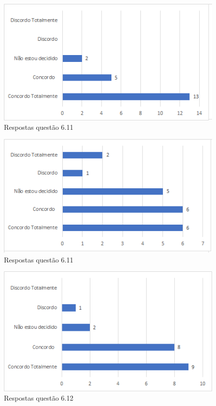 \begin{figure}[!t]
\centering
\includegraphics[scale=0.7]{figuras das questoes/6.10.png}
\caption{Respostas questão 6.11}
\end{figure}

\begin{figure}[!t]
\centering
\includegraphics[scale=0.7]{figuras das questoes/6.11.png}
\caption{Respostas questão 6.11}
\end{figure}

\begin{figure}[!t]
\centering
\includegraphics[scale=0.7]{figuras das questoes/6.12.png}
\caption{Respostas questão 6.12}
\end{figure}

